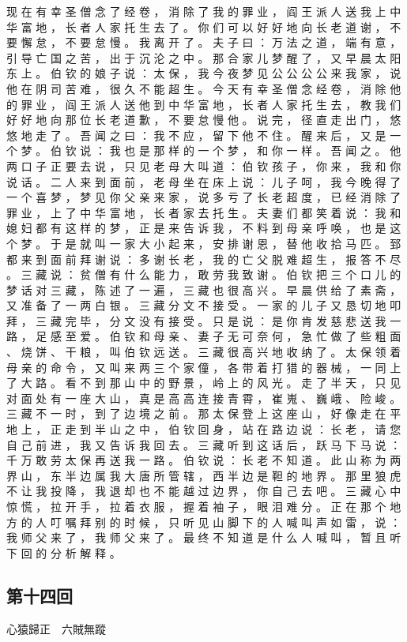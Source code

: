 {现 在 有 幸 圣 僧 念 了 经 卷 ， 消 除 了 我 的 罪 业 ， 阎 王 派 人 送 我 上 中 华 富 地 ， 长 者 人 家 托 生 去 了 。
你 们 可 以 好 好 地 向 长 老 道 谢 ， 不 要 懈 怠 ， 不 要 怠 慢 。
我 离 开 了 。
夫 子 曰 ： 万 法 之 道 ， 端 有 意 ， 引 导 亡 国 之 苦 ， 出 于 沉 沦 之 中 。
那 合 家 儿 梦 醒 了 ， 又 早 晨 太 阳 东 上 。
伯 钦 的 娘 子 说 ： 太 保 ， 我 今 夜 梦 见 公 公 公 公 来 我 家 ， 说 他 在 阴 司 苦 难 ， 很 久 不 能 超 生 。
今 天 有 幸 圣 僧 念 经 卷 ， 消 除 他 的 罪 业 ， 阎 王 派 人 送 他 到 中 华 富 地 ， 长 者 人 家 托 生 去 ， 教 我 们 好 好 地 向 那 位 长 老 道 歉 ， 不 要 怠 慢 他 。
说 完 ， 径 直 走 出 门 ， 悠 悠 地 走 了 。
吾 闻 之 曰 ： 我 不 应 ， 留 下 他 不 住 。
醒 来 后 ， 又 是 一 个 梦 。
伯 钦 说 ： 我 也 是 那 样 的 一 个 梦 ， 和 你 一 样 。
吾 闻 之 。
他 两 口 子 正 要 去 说 ， 只 见 老 母 大 叫 道 ： 伯 钦 孩 子 ， 你 来 ， 我 和 你 说 话 。
二 人 来 到 面 前 ， 老 母 坐 在 床 上 说 ： 儿 子 呵 ， 我 今 晚 得 了 一 个 喜 梦 ， 梦 见 你 父 亲 来 家 ， 说 多 亏 了 长 老 超 度 ， 已 经 消 除 了 罪 业 ， 上 了 中 华 富 地 ， 长 者 家 去 托 生 。
夫 妻 们 都 笑 着 说 ： 我 和 媳 妇 都 有 这 样 的 梦 ， 正 是 来 告 诉 我 ， 不 料 到 母 亲 呼 唤 ， 也 是 这 个 梦 。
于 是 就 叫 一 家 大 小 起 来 ， 安 排 谢 恩 ， 替 他 收 拾 马 匹 。 郅 都 来 到 面 前 拜 谢 说 ： 多 谢 长 老 ， 我 的 亡 父 脱 难 超 生 ， 报 答 不 尽 。
三 藏 说 ： 贫 僧 有 什 么 能 力 ， 敢 劳 我 致 谢 。 伯 钦 把 三 个 口 儿 的 梦 话 对 三 藏 ， 陈 述 了 一 遍 ， 三 藏 也 很 高 兴 。
早 晨 供 给 了 素 斋 ， 又 准 备 了 一 两 白 银 。
三 藏 分 文 不 接 受 。
一 家 的 儿 子 又 恳 切 地 叩 拜 ， 三 藏 完 毕 ， 分 文 没 有 接 受 。
只 是 说 ： 是 你 肯 发 慈 悲 送 我 一 路 ， 足 感 至 爱 。
伯 钦 和 母 亲 、 妻 子 无 可 奈 何 ， 急 忙 做 了 些 粗 面 、 烧 饼 、 干 粮 ， 叫 伯 钦 远 送 。
三 藏 很 高 兴 地 收 纳 了 。
太 保 领 着 母 亲 的 命 令 ， 又 叫 来 两 三 个 家 僮 ， 各 带 着 打 猎 的 器 械 ， 一 同 上 了 大 路 。
看 不 到 那 山 中 的 野 景 ， 岭 上 的 风 光 。
走 了 半 天 ， 只 见 对 面 处 有 一 座 大 山 ， 真 是 高 高 连 接 青 霄 ， 崔 嵬 、 巍 峨 、 险 峻 。
三 藏 不 一 时 ， 到 了 边 境 之 前 。
那 太 保 登 上 这 座 山 ， 好 像 走 在 平 地 上 ， 正 走 到 半 山 之 中 ， 伯 钦 回 身 ， 站 在 路 边 说 ： 长 老 ， 请 您 自 己 前 进 ， 我 又 告 诉 我 回 去 。
三 藏 听 到 这 话 后 ， 跃 马 下 马 说 ： 千 万 敢 劳 太 保 再 送 我 一 路 。
伯 钦 说 ： 长 老 不 知 道 。
此 山 称 为 两 界 山 ， 东 半 边 属 我 大 唐 所 管 辖 ， 西 半 边 是 靼 的 地 界 。
那 里 狼 虎 不 让 我 投 降 ， 我 退 却 也 不 能 越 过 边 界 ， 你 自 己 去 吧 。
三 藏 心 中 惊 慌 ， 拉 开 手 ， 拉 着 衣 服 ， 握 着 袖 子 ， 眼 泪 难 分 。
正 在 那 个 地 方 的 人 叮 嘱 拜 别 的 时 候 ， 只 听 见 山 脚 下 的 人 喊 叫 声 如 雷 ， 说 ： 我 师 父 来 了 ， 我 师 父 来 了 。
最 终 不 知 道 是 什 么 人 喊 叫 ， 暂 且 听 下 回 的 分 析 解 释 。
}\switchcolumn\flushpage  \begin{pinyinscope}{\myfontt \section{第十四回}     心猿歸正　六賊無蹤

}
\end{pinyinscope}

